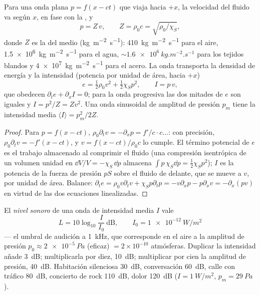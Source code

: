 \begin{proposition}\label{prop:b2:sound-waves:plane}
Para una onda plana $p = f(x - ct)$ que viaja hacia $+x$, la velocidad del
fluido va según $x$, en fase con la , y
\[
p = Z\,v , \qquad Z = \rho_0c = \sqrt{\rho_0/\chi_S} ,
\]
donde $Z$ es la \emph{} del medio
(\unit{kg.m^{-2}.s^{-1}}): \qty{410}{kg.m^{-2}.s^{-1}} para el aire, \qty{1.5e6}{kg.m^{-2}.s^{-1}}
para el agua, $\sim\qty{1.6e6}{kg.m^{-2}.s^{-1}}$ para los tejidos blandos y
\qty{4e7}{kg.m^{-2}.s^{-1}} para el acero. La onda transporta la densidad de
energía y la intensidad (potencia por unidad de área, hacia $+x$)
\[
e = \tfrac12\rho_0v^2 + \tfrac12\chi_Sp^2 , \qquad I = p\,v ,
\]
que obedecen $\partial_te + \partial_xI = 0$; para la onda progresiva las dos
mitades de $e$ son iguales y $I = p^2/Z = Zv^2$. Una onda sinusoidal de
amplitud de presión $p_m$ tiene la intensidad media $\langle I\rangle = p_m^2/2Z$.
\end{proposition}

\begin{proof}
Para $p = f(x - ct)$, $\rho_0\partial_tv = -\partial_xp = f'/c\cdot c\dots$: con precisión,
$\rho_0\partial_tv = -f'(x - ct)$, y $v = f(x - ct)/\rho_0c$ lo cumple. El
término potencial de $e$ es el trabajo almacenado al comprimir el fluido
(una compresión isentrópica de un volumen unidad en $\dd V/V = -\chi_S\,\dd p$
almacena $\int p\,\chi_S\dd p = \tfrac12\chi_Sp^2$); $I$ es la potencia de la
fuerza de presión $pS$ sobre el fluido de delante, que se mueve a $v$, por unidad de área.
Balance: $\partial_te = \rho_0v\partial_tv + \chi_Sp\partial_tp = -v\partial_xp - p\partial_xv =
-\partial_x(pv)$ en virtud de las dos ecuaciones linealizadas.
\end{proof}

\begin{definition}\label{def:b2:sound-waves:decibel}
El \emph{nivel sonoro} de una onda de intensidad media $I$ vale
\[
L = 10\log_{10}\frac I{I_0} \ \text{dB} , \qquad I_0 = \qty{1e-12}{W/m^2}
\]
--- el umbral de audición a \qty{1}{kHz}, que corresponde en el aire a la
amplitud de presión $p_0 \approx \qty{2e-5}{Pa}$ (eficaz) $= 2 \times 10^{-10}$
atmósferas. Duplicar la intensidad añade \qty{3}{dB}; multiplicarla por diez, \qty{10}{dB};
multiplicar por cien la amplitud de presión, \qty{40}{dB}. Habitación silenciosa
\qty{30}{dB}, conversación \qty{60}{dB}, calle con tráfico \qty{80}{dB}, concierto de rock
\qty{110}{dB}, dolor \qty{120}{dB} ($I = \qty{1}{W/m^2}$, $p_m = \qty{29}{Pa}$).
\end{definition}

